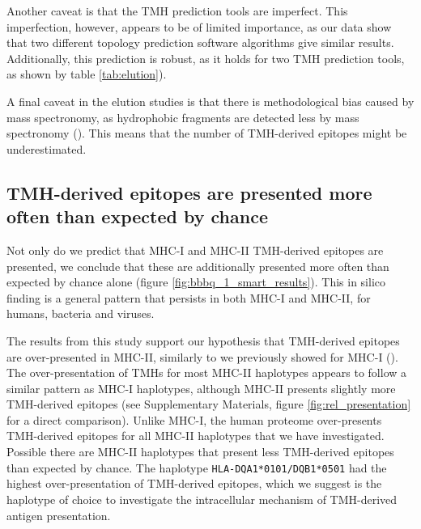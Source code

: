 Another caveat is that the TMH prediction tools are imperfect.
This imperfection, however, appears to be of limited importance,
as our data show that two different topology prediction software algorithms give similar results.
Additionally, this 
prediction is robust, as it holds for two TMH prediction tools, 
as shown by table \ref{tab:elution}).

A final caveat in the elution studies is that there is methodological bias caused by mass spectronomy,
as hydrophobic fragments are detected less 
by mass spectronomy (\cite{bianchi2017}). This means that the number of TMH-derived epitopes
might be underestimated.

\subsection{TMH-derived epitopes are presented more often than expected by chance}


Not only do we predict that MHC-I and MHC-II TMH-derived epitopes 
are presented, we conclude that these are additionally
presented more often than expected by chance 
alone (figure \ref{fig:bbbq_1_smart_results}).
This in silico finding is a general pattern 
that persists in both MHC-I and MHC-II, 
for humans, bacteria and viruses. 

The results from this study support our hypothesis 
that TMH-derived epitopes are over-presented
in MHC-II, similarly to we previously showed for MHC-I (\cite{bianchi2017}). 
The over-presentation of TMHs for most MHC-II haplotypes 
appears to follow a similar pattern as MHC-I haplotypes,
although MHC-II presents slightly more TMH-derived
epitopes (see Supplementary Materials, figure \ref{fig:rel_presentation}
for a direct comparison). 
Unlike MHC-I, the human proteome over-presents TMH-derived
epitopes for all MHC-II haplotypes that we have investigated.
Possible there are MHC-II haplotypes that present less TMH-derived
epitopes than expected by chance.
The haplotype \verb;HLA-DQA1*0101/DQB1*0501; had the highest
over-presentation of TMH-derived epitopes,
which we suggest is the haplotype of choice 
to investigate the intracellular mechanism of TMH-derived
antigen presentation.

